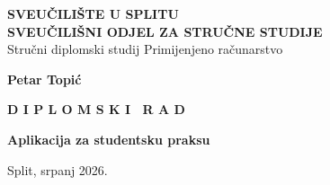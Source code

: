 \begin{titlepage}
    \begin{center}
        \Large \textbf{SVEUČILIŠTE U SPLITU}\\[0.6em]
        \large \textbf{SVEUČILIŠNI ODJEL ZA STRUČNE STUDIJE}\\[0.6em]
        \normalsize Stručni diplomski studij Primijenjeno računarstvo

        \vspace{3cm}

        \large \textbf{Petar Topić}

        \vspace{1cm}

        \LARGE \textbf{D I P L O M S K I \ R A D}

        \vspace{1cm}

        \large \textbf{Aplikacija za studentsku praksu}

        \vfill

        \normalsize Split, srpanj 2026.
    \end{center}
\end{titlepage}

